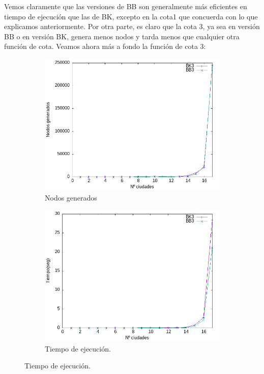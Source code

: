 \documentclass{article}
\begin{document}
Vemos claramente que las versiones de BB son generalmente más eficientes en tiempo de ejecución que las de BK, excepto en la cota1 que concuerda con lo que explicamos anteriormente. Por otra parte, es claro que la cota 3, ya sea en versión BB o en versión BK, genera menos nodos y tarda menos que cualquier otra función de cota. Veamos ahora más a fondo la función de cota 3: 

\begin{figure}[H]
    \centering
    \begin{subfigure}[b]{0.45\textwidth}
        \centering
        \includegraphics[width=\textwidth]{Sucio_Olga/img/Comparativa_nodes3_linespoints.png}
        \caption{Nodos generados}
    \end{subfigure}
    \begin{subfigure}[b]{0.45\textwidth}
        \centering %
        \includegraphics[width=\textwidth]{Sucio_Olga/img/Comparativa_tiempos_3_linespoints.png}
        \caption{Tiempo de ejecución.}
    \end{subfigure}
\end{figure}
\end{document}
